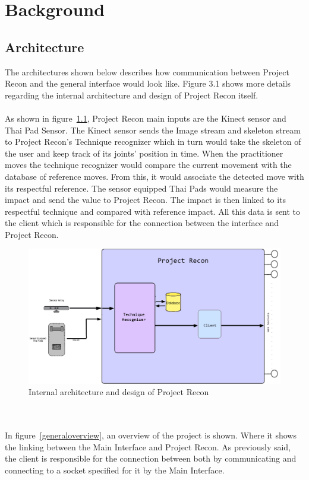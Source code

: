 \chapter{Background}\label{chap:background}
\section{Architecture}
The architectures shown below describes how communication between Project Recon and the general interface would look like. Figure 3.1 shows more details regarding the internal architecture and design of Project Recon itself.
\\
\\
As shown in figure~\ref{projectrecondiagram}, Project Recon main inputs are the Kinect sensor and Thai Pad Sensor. The Kinect sensor sends the Image stream and skeleton stream to Project Recon's Technique recognizer which in turn would take the skeleton of the user and keep track of its joints' position in time. When the practitioner moves the technique recognizer would compare the current movement with the database of reference moves. From this, it would associate the detected move with its respectful reference. The sensor equipped Thai Pads would measure the impact and send the value to Project Recon. The impact is then linked to its respectful technique and compared with reference impact. All this data is sent to the client which is responsible for the connection between the interface and Project Recon.
\begin{figure}[htb]
\centering
\includegraphics[width=1\textwidth]{images/project_Recon_diagram.png}
\caption{Internal architecture and design of Project Recon}
\label{projectrecondiagram}
\end{figure}
\\
\\
In figure~\ref{generaloverview}, an overview of the project is shown. Where it shows the linking between the Main Interface and Project Recon. As previously said, the client is responsible for the connection between both by communicating and connecting to a socket specified for it by the Main Interface.
